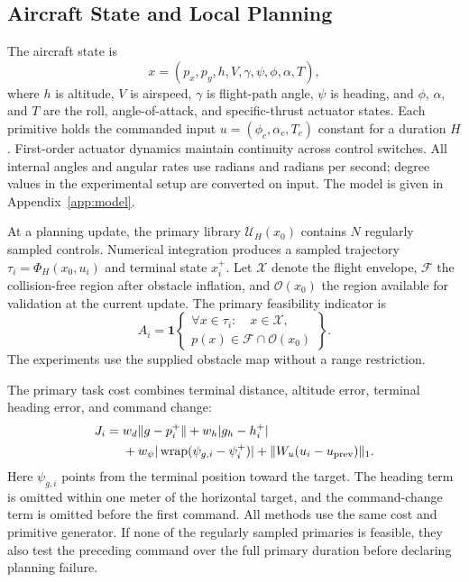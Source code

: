 \documentclass[journal]{IEEEtran}
\newcommand{\wrap}{\operatorname{wrap}}
\begin{document}
\subsection{Aircraft State and Local Planning}
The aircraft state is
\begin{equation}
 x=(p_x,p_y,h,V,\gamma,\psi,\phi,\alpha,T),
\end{equation}
where $h$ is altitude, $V$ is airspeed, $\gamma$ is flight-path angle, $\psi$ is heading, and $\phi$, $\alpha$, and $T$ are the roll, angle-of-attack, and specific-thrust actuator states. Each primitive holds the commanded input $u=(\phi_c,\alpha_c,T_c)$ constant for a duration $H$. First-order actuator dynamics maintain continuity across control switches. All internal angles and angular rates use radians and radians per second; degree values in the experimental setup are converted on input. The model is given in Appendix~\ref{app:model}.

At a planning update, the primary library $\mathcal U_H(x_0)$ contains $N$ regularly sampled controls. Numerical integration produces a sampled trajectory $\tau_i=\Phi_H(x_0,u_i)$ and terminal state $x_i^+$. Let $\mathcal X$ denote the flight envelope, $\mathcal F$ the collision-free region after obstacle inflation, and $\mathcal O(x_0)$ the region available for validation at the current update. The primary feasibility indicator is
\begin{equation}
 A_i=\mathbf 1\left\{\begin{array}{l}
 \forall x\in\tau_i:\quad x\in\mathcal X,\\
 p(x)\in\mathcal F\cap\mathcal O(x_0)
 \end{array}\right\}.
 \label{eq:primary}
\end{equation}
The experiments use the supplied obstacle map without a range restriction.

The primary task cost combines terminal distance, altitude error, terminal heading error, and command change:
\begin{align}
 J_i={}&w_d\|g-p_i^+\|+w_h|g_h-h_i^+|\nonumber\\
 &+w_\psi|\wrap(\psi_{g,i}-\psi_i^+)|
 +\|W_u(u_i-u_{\rm prev})\|_1 . \label{eq:cost}
\end{align}
Here $\psi_{g,i}$ points from the terminal position toward the target. The heading term is omitted within one meter of the horizontal target, and the command-change term is omitted before the first command. All methods use the same cost and primitive generator. If none of the regularly sampled primaries is feasible, they also test the preceding command over the full primary duration before declaring planning failure.
\end{document}
